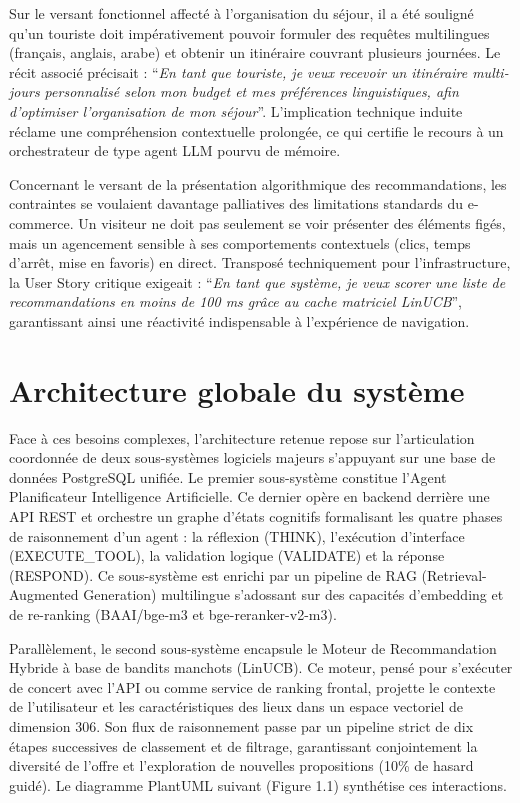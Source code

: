 Sur le versant fonctionnel affecté à l'organisation du séjour, il a été souligné qu'un touriste doit impérativement pouvoir formuler des requêtes multilingues (français, anglais, arabe) et obtenir un itinéraire couvrant plusieurs journées. Le récit associé précisait : \enquote{\textit{En tant que touriste, je veux recevoir un itinéraire multi-jours personnalisé selon mon budget et mes préférences linguistiques, afin d'optimiser l'organisation de mon séjour}}. L'implication technique induite réclame une compréhension contextuelle prolongée, ce qui certifie le recours à un orchestrateur de type agent LLM pourvu de mémoire.

Concernant le versant de la présentation algorithmique des recommandations, les contraintes se voulaient davantage palliatives des limitations standards du e-commerce. Un visiteur ne doit pas seulement se voir présenter des éléments figés, mais un agencement sensible à ses comportements contextuels (clics, temps d'arrêt, mise en favoris) en direct. Transposé techniquement pour l'infrastructure, la User Story critique exigeait : \enquote{\textit{En tant que système, je veux scorer une liste de recommandations en moins de 100 ms grâce au cache matriciel LinUCB}}, garantissant ainsi une réactivité indispensable à l'expérience de navigation.

\section{Architecture globale du système}

Face à ces besoins complexes, l'architecture retenue repose sur l'articulation coordonnée de deux sous-systèmes logiciels majeurs s'appuyant sur une base de données PostgreSQL unifiée. Le premier sous-système constitue l'Agent Planificateur Intelligence Artificielle. Ce dernier opère en backend derrière une API REST et orchestre un graphe d'états cognitifs formalisant les quatre phases de raisonnement d'un agent : la réflexion (THINK), l'exécution d'interface (EXECUTE\_TOOL), la validation logique (VALIDATE) et la réponse (RESPOND). Ce sous-système est enrichi par un pipeline de RAG (Retrieval-Augmented Generation) multilingue s'adossant sur des capacités d'embedding et de re-ranking (BAAI/bge-m3 et bge-reranker-v2-m3).

Parallèlement, le second sous-système encapsule le Moteur de Recommandation Hybride à base de bandits manchots (LinUCB). Ce moteur, pensé pour s'exécuter de concert avec l'API ou comme service de ranking frontal, projette le contexte de l'utilisateur et les caractéristiques des lieux dans un espace vectoriel de dimension 306. Son flux de raisonnement passe par un pipeline strict de dix étapes successives de classement et de filtrage, garantissant conjointement la diversité de l'offre et l'exploration de nouvelles propositions (10\% de hasard guidé). Le diagramme PlantUML suivant (Figure 1.1) synthétise ces interactions.

